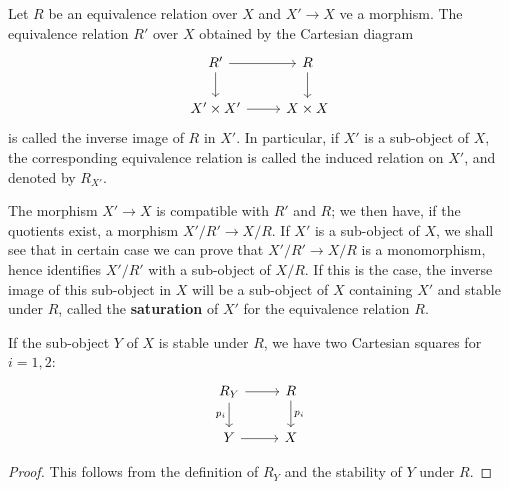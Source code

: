 \begin{definition}
Let $R$ be an equivalence relation over $X$ and $X'\to X$ ve a morphism. The equivalence relation $R'$ over $X$ obtained by the Cartesian diagram
\[\begin{tikzcd}
R'\ar[r]\ar[d]&R\ar[d]\\
X'\times X'\ar[r]&X\times X
\end{tikzcd}\]
is called the inverse image of $R$ in $X'$. In particular, if $X'$ is a sub-object of $X$, the corresponding equivalence relation is called the induced relation on $X'$, and denoted by $R_{X'}$.
\end{definition}

The morphism $X'\to X$ is compatible with $R'$ and $R$; we then have, if the quotients exist, a morphism $X'/R'\to X/R$. If $X'$ is a sub-object of $X$, we shall see that in certain case we can prove that $X'/R'\to X/R$ is a monomorphism, hence identifies $X'/R'$ with a sub-object of $X/R$. If this is the case, the inverse image of this sub-object in $X$ will be a sub-object of $X$ containing $X'$ and stable under $R$, called the \textbf{saturation} of $X'$ for the equivalence relation $R$.

\begin{proposition}\label{category equivalence relation subobject Cartesian diagram}
If the sub-object $Y$ of $X$ is stable under $R$, we have two Cartesian squares for $i=1,2$:
\[\begin{tikzcd}
R_Y\ar[r]\ar[d,swap,"p_i"]&R\ar[d,"p_i"]\\
Y\ar[r]&X
\end{tikzcd}\]
\end{proposition}
\begin{proof}
This follows from the definition of $R_Y$ and the stability of $Y$ under $R$.
\end{proof}

